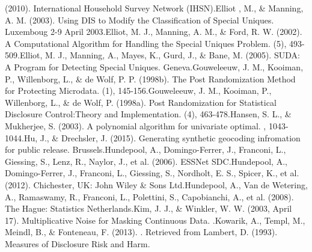 \documentclass[letterpaper,10pt,english]{sphinxmanual}
\begin{document}
(2010).  International Household Survey Network (IHSN).Elliot , M., \&
Manning, A. M. (2003). Using DIS to Modify the Classification of Special
Uniques.  Luxemboug 2-9 April 2003.Elliot, M. J., Manning,
A. M., \& Ford, R. W. (2002). A Computational Algorithm for Handling the
Special Uniques Problem.   (5), 493-509.Elliot, M. J.,
Manning, A., Mayes, K., Gurd, J., \& Bane, M. (2005). SUDA: A Program for
Detecting Special Uniques.  Geneva.Gouweleeuw, J. M., Kooiman,
P., Willenborg, L., \& de Wolf, P. P. (1998b). The Post Randomization
Method for Protecting Microdata.   (1), 145-156.Gouweleeuw, J. M., Kooiman,
P., Willenborg, L., \& de Wolf, P. (1998a). Post Randomization for
Statistical Disclosure Control:Theory and Implementation.   (4), 463-478.Hansen, S. L., \& Mukherjee, S.
(2003). A polynomial algorithm for univariate optimal.  , 1043-1044.Hu,
J., \& Drechsler, J. (2015). Generating synthetic geocoding infromation
for public release.  Brussels.Hundepool, A., Domingo-Ferrer,
J., Franconi, L., Giessing, S., Lenz, R., Naylor, J., et al. (2006).
 ESSNet SDC.Hundepool, A.,
Domingo-Ferrer, J., Franconi, L., Giessing, S., Nordholt, E. S., Spicer,
K., et al. (2012).  Chichester, UK:
John Wiley \& Sons Ltd.Hundepool, A., Van de Wetering, A., Ramaswamy, R.,
Franconi, L., Polettini, S., Capobianchi, A., et al. (2008).  The Hague: Statistics Netherlands.Kim, J. J., \& Winkler,
W. W. (2003, April 17). Multiplicative Noise for Masking Continuous
Data.  .Kowarik, A., Templ, M., Meindl, B., \&
Fonteneau, F. (2013). .
Retrieved from Lambert, D. (1993). Measures of Disclosure Risk and Harm.
\end{document}
